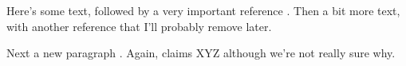 \documentclass{article}
\begin{document}
Here's some text, followed by a very important reference
\cite<here I feel obligated to cite>[even though it's not really
necessary]{small}.  Then a bit more text, with another reference
\cite{small} that I'll probably remove later.

Next a new paragraph \cite{big}.  Again,  claims XYZ
although we're not really sure why.




\end{document}
